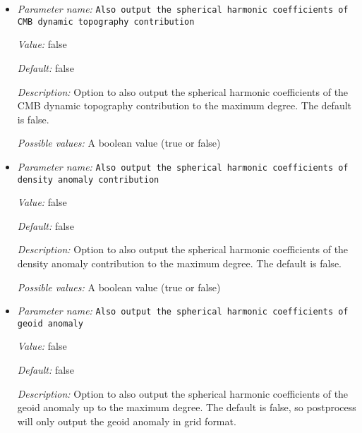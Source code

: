 \begin{itemize}
\item {\it Parameter name:} {\tt Also output the spherical harmonic coefficients of CMB dynamic topography contribution}
\label{parameters:Postprocess/Geoid/Also output the spherical harmonic coefficients of CMB dynamic topography contribution}


{\it Value:} false


{\it Default:} false


{\it Description:} Option to also output the spherical harmonic coefficients of the CMB dynamic topography contribution to the maximum degree. The default is false. 


{\it Possible values:} A boolean value (true or false)
\item {\it Parameter name:} {\tt Also output the spherical harmonic coefficients of density anomaly contribution}
\label{parameters:Postprocess/Geoid/Also output the spherical harmonic coefficients of density anomaly contribution}


{\it Value:} false


{\it Default:} false


{\it Description:} Option to also output the spherical harmonic coefficients of the density anomaly contribution to the maximum degree. The default is false. 


{\it Possible values:} A boolean value (true or false)
\item {\it Parameter name:} {\tt Also output the spherical harmonic coefficients of geoid anomaly}
\label{parameters:Postprocess/Geoid/Also output the spherical harmonic coefficients of geoid anomaly}


{\it Value:} false


{\it Default:} false


{\it Description:} Option to also output the spherical harmonic coefficients of the geoid anomaly up to the maximum degree. The default is false, so postprocess will only output the geoid anomaly in grid format. 



\end{itemize}
